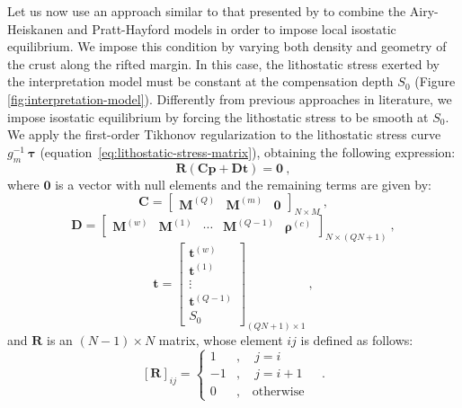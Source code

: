\documentclass[manuscript,revised]{geophysics}
\begin{document}
Let us now use an approach similar to that presented by \citet{ferderer-etal2017}
to combine the Airy-Heiskanen and Pratt-Hayford models \citep{heiskanen-moritz1967} 
in order to impose local isostatic equilibrium.
We impose this condition by varying both density and geometry of the crust along the 
rifted margin.
In this case, the lithostatic stress exerted by the interpretation model
must be constant at the compensation depth $S_{0}$
(Figure \ref{fig:interpretation-model}).
Differently from previous approaches in literature, we impose isostatic equilibrium 
by forcing the lithostatic stress to be smooth at $S_{0}$.
We apply the first-order Tikhonov regularization
\citep{aster-etal2005} to the lithostatic stress curve $g_{m}^{-1} \: \boldsymbol{\tau}$
(equation~\ref{eq:lithostatic-stress-matrix}), obtaining the
following expression:
\begin{equation}
\mathbf{R} \left( \mathbf{C} \mathbf{p} + \mathbf{D} \mathbf{t} \right) = \mathbf{0} 
\: ,
\label{eq:tik1-lithostatic-stress}
\end{equation}
where $\mathbf{0}$ is a vector with null elements and the remaining terms are given by:
\begin{equation}
\mathbf{C} = \begin{bmatrix}
\mathbf{M}^{(Q)} & \mathbf{M}^{(m)} & \mathbf{0}
\end{bmatrix}_{N \times M} \: ,
\label{eq:matrix-C}
\end{equation}
\begin{equation}
\mathbf{D} = \begin{bmatrix}
\mathbf{M}^{(w)} & \mathbf{M}^{(1)} & \cdots & \mathbf{M}^{(Q-1)} &
\boldsymbol{\rho}^{(c)}
\end{bmatrix}_{N \times \left( QN + 1 \right)} \: ,
\label{eq:matrix-D}
\end{equation}
\begin{equation}
\mathbf{t} = \begin{bmatrix}
\mathbf{t}^{(w)} \\ \mathbf{t}^{(1)} \\ \vdots \\ \mathbf{t}^{(Q-1)} \\ S_{0}
\end{bmatrix}_{\left( QN + 1 \right) \times 1}\: ,
\label{eq:vector-t}
\end{equation}
and $\mathbf{R}$ is an $\left( N-1 \right) \times N$ matrix, whose element 
$ij$ is defined as follows:
\begin{equation}
\left[ \mathbf{R} \right]_{ij} = \begin{cases}
1 &, \quad j = i \\
-1 &, \quad j = i + 1 \\
0 &, \quad \text{otherwise}
\end{cases} \quad .
\label{eq:matrix-R}
\end{equation}
\end{document}
